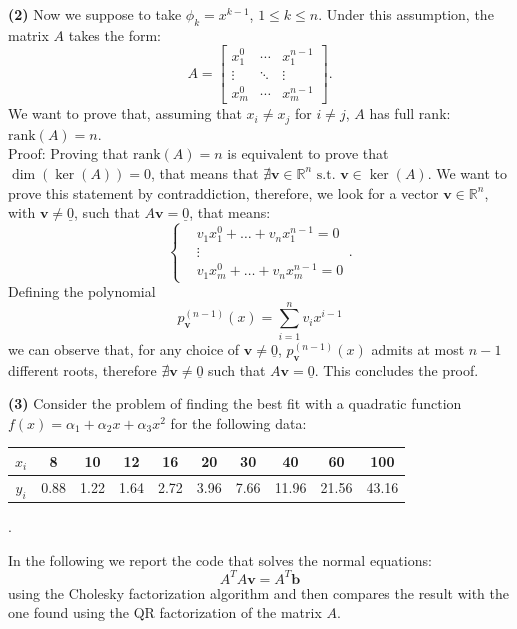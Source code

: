 \documentclass[a4paper,11pt]{article}
\newcommand{\R}{\mathbb{R}}
\begin{document}
\noindent \textbf{(2)} Now we suppose to take $\phi_k = x^{k-1}$, $1 \le k \le n$. Under this assumption, the matrix $A$ takes the form:
\begin{equation}\label{key}
	A = \begin{bmatrix}
		x_1^0 & \cdots & x_1^{n-1}  \\
		\vdots & \ddots & \vdots \\
		x_m^0 & \cdots  & x_m^{n-1}
	\end{bmatrix}.
\end{equation}
We want to prove that, assuming that $x_i\neq x_j$ for $i \neq j$, $A$ has full rank: $\text{rank}(A) = n$.\\
Proof: Proving that $\text{rank}(A) = n$ is equivalent to prove that $\dim(\ker(A)) = 0$, that means that $\nexists \textbf{v} \in \R^n \text{ s.t. } \textbf{v} \in \ker(A)$. We want to prove this statement by contraddiction, therefore, we look for a vector $\textbf{v} \in \R^n$, with $\textbf{v} \neq \underline{0}$, such that $A\textbf{v}=\underline{0}$, that means:
\begin{equation}\label{key}
	\left\lbrace 
	\begin{split}
		&  v_1 x_1^0 + \dots + v_n x_1^{n-1} = 0\\
		& \vdots  \\
		&  v_1 x_m^0 + \dots + v_n x_m^{n-1} = 0 
	\end{split} \right.  .
\end{equation}
Defining the polynomial 
\begin{equation}\label{key}
	p^{(n-1)}_{\textbf{v}}(x) = \sum_{i=1}^{n} v_i x^{i-1}
\end{equation}
we can observe that, for any choice of $\textbf{v} \neq \underline{0}$, $p^{(n-1)}_{\textbf{v}}(x)$ admits at most $n-1$ different roots, therefore $\nexists \textbf{v} \neq \underline{0}$ such that $A\textbf{v}=\underline{0}$. This concludes the proof. \qedsymbol

\noindent \textbf{(3)} Consider the problem of finding the best fit with a quadratic function $f(x) = \alpha_1 + \alpha_2 x + \alpha_3 x^2$ for the following data:\\
\begin{center}	
\begin{tabular}{c|c|c|c|c|c|c|c|c|c}
	$x_i$& 8 & 10 & 12 & 16 & 20 & 30 & 40 & 60 & 100 \\
	\hline
	$y_i$& 0.88 & 1.22 & 1.64 & 2.72 & 3.96 & 7.66 & 11.96 & 21.56 & 43.16 \\
\end{tabular}.
\end{center}
In the following we report the code that solves the normal equations:
\begin{equation}\label{key}
	A^T A \textbf{v} = A^T \textbf{b}
\end{equation}
using the Cholesky factorization algorithm and then compares the result with the one found using the QR factorization of the matrix $A$.
\end{document}
